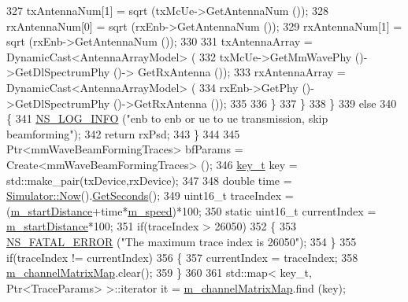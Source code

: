 \begin{DoxyCode}
327                                 txAntennaNum[1] = sqrt (txMcUe->GetAntennaNum ());
328                                 rxAntennaNum[0] = sqrt (rxEnb->GetAntennaNum ());
329                                 rxAntennaNum[1] = sqrt (rxEnb->GetAntennaNum ());
330 
331                                 txAntennaArray = DynamicCast<AntennaArrayModel> (
332                                                         txMcUe->GetMmWavePhy ()->GetDlSpectrumPhy ()->
      GetRxAntenna ());
333                                 rxAntennaArray = DynamicCast<AntennaArrayModel> (
334                                                         rxEnb->GetPhy ()->GetDlSpectrumPhy ()->GetRxAntenna
       ());
335 
336                         \}
337                 \}
338         \}
339         \textcolor{keywordflow}{else}
340         \{
341                 \hyperlink{group__logging_gafbd73ee2cf9f26b319f49086d8e860fb}{NS\_LOG\_INFO} (\textcolor{stringliteral}{"enb to enb or ue to ue transmission, skip beamforming"});
342                 \textcolor{keywordflow}{return} rxPsd;
343         \}
344 
345         Ptr<mmWaveBeamFormingTraces> bfParams = Create<mmWaveBeamFormingTraces> ();
346         \hyperlink{namespacens3_aa42bd408e172586b3b192acfaa36b070}{key\_t} key = std::make\_pair(txDevice,rxDevice);
347 
348         \textcolor{keywordtype}{double} time = \hyperlink{classns3_1_1Simulator_ac3178fa975b419f7875e7105be122800}{Simulator::Now}().\hyperlink{classns3_1_1Time_a8f20d5c3b0902d7b4320982f340b57c8}{GetSeconds}();
349         uint16\_t traceIndex = (\hyperlink{classns3_1_1MmWaveChannelRaytracing_a796e2c26275e231a09c4049cf8af289d}{m\_startDistance}+time*\hyperlink{classns3_1_1MmWaveChannelRaytracing_a318db9adde133cf62fd929bbd3b2b62e}{m\_speed})*100;
350         \textcolor{keyword}{static} uint16\_t currentIndex = \hyperlink{classns3_1_1MmWaveChannelRaytracing_a796e2c26275e231a09c4049cf8af289d}{m\_startDistance}*100;
351         \textcolor{keywordflow}{if}(traceIndex > 26050)
352         \{
353                 \hyperlink{group__fatal_ga5131d5e3f75d7d4cbfd706ac456fdc85}{NS\_FATAL\_ERROR} (\textcolor{stringliteral}{"The maximum trace index is 26050"});
354         \}
355         \textcolor{keywordflow}{if}(traceIndex != currentIndex)
356         \{
357                 currentIndex = traceIndex;
358                 \hyperlink{classns3_1_1MmWaveChannelRaytracing_abdee4d8795a80d738563c52ec233cfdd}{m\_channelMatrixMap}.clear();
359         \}
360 
361         std::map< key\_t, Ptr<TraceParams> >::iterator it = \hyperlink{classns3_1_1MmWaveChannelRaytracing_abdee4d8795a80d738563c52ec233cfdd}{m\_channelMatrixMap}.find (key);

\end{DoxyCode}

